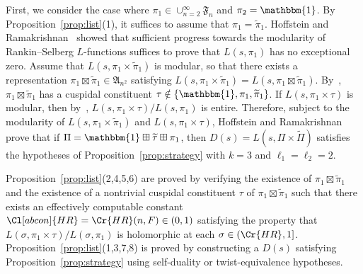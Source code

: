 \documentclass[11pt]{amsart}
\theoremstyle{remark}
\renewcommand{\tilde}{\widetilde}
\numberwithin{equation}{section}
\begin{document}
First, we consider the case where $\pi_1\in\cup_{n=2}^{\infty}\mathfrak{F}_{n}$ and $\pi_2=\mathbbm{1}$.  By Proposition~\ref{prop:list}(1), it suffices to assume that $\pi_1=\tilde{\pi}_1$.  Hoffstein and Ramakrishnan~\cite[Proof~of~Theorem~B]{HoffsteinRamakrishnan} showed that sufficient progress towards the modularity of Rankin--Selberg $L$-functions suffices to prove that $L(s,\pi_1)$ has no exceptional zero.  Assume that $L(s,\pi_1\times\widetilde{\pi}_1)$ is modular, so that there exists a representation $\pi_1\boxtimes\widetilde{\pi}_1\in\mathfrak{A}_{n^2}$ satisfying $L(s,\pi_1\times\widetilde{\pi}_1)=L(s,\pi_1\boxtimes\widetilde{\pi}_1)$.  By~\cite[Lemma~4.4]{HoffsteinRamakrishnan}, $\pi_1\boxtimes\widetilde{\pi}_1$ has a cuspidal constituent $\tau\notin\{\mathbbm{1},\pi_1,\widetilde{\pi}_1\}$.  If $L(s,\pi_1\times\tau)$ is modular, then by~\cite[Proofs~of~Lemma~4.4~and~Claim~4.5]{HoffsteinLockhart}, $L(s,\pi_1\times\tau)/L(s,\pi_1)$ is entire.  Therefore, subject to the modularity of $L(s,\pi_1\times\widetilde{\pi}_1)$ and $L(s,\pi_1\times\tau)$, Hoffstein and Ramakrishnan prove that if $\Pi=\mathbbm{1}\boxplus\widetilde{\tau}\boxplus\pi_1$, then $D(s)=L(s,\Pi\times\widetilde{\Pi})$ satisfies the hypotheses of Proposition~\ref{prop:strategy} with $k=3$ and $\ell_1=\ell_2=2$.

Proposition~\ref{prop:list}(2,4,5,6) are proved by verifying the existence of $\pi_1\boxtimes\widetilde{\pi}_1$ and the existence of a nontrivial cuspidal constituent $\tau$ of $\pi_1\boxtimes\widetilde{\pi}_1$ such that there exists an effectively computable constant $\Cl[abcon]{HR}=\Cr{HR}(n,F)\in(0,1)$ satisfying the property that $L(\sigma,\pi_1\times\tau)/L(\sigma,\pi_1)$ is holomorphic at each $\sigma\in(\Cr{HR},1]$.  Proposition~\ref{prop:list}(1,3,7,8) is proved by constructing a $D(s)$ satisfying Proposition~\ref{prop:strategy} using self-duality or twist-equivalence hypotheses.
\end{document}
